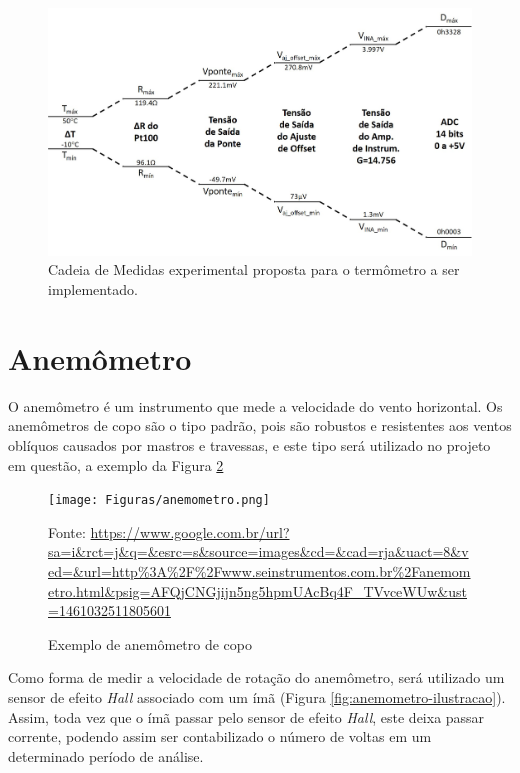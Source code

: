 \documentclass[a4paper]{instrumentacao}
\begin{document}
\begin{figure}[H]
	\centering \includegraphics[width=\textwidth]{termometro-cadeia-medidas-proposta.jpg}
	\caption{Cadeia de Medidas experimental proposta para o termômetro a ser implementado.}
	\label{fig:termometro-cadeia-medidas-proposta}
\end{figure}

\section{Anemômetro}
O anemômetro é um instrumento que mede a velocidade do vento horizontal. Os anemômetros de copo são o tipo padrão, pois são robustos e resistentes aos ventos oblíquos causados por mastros e travessas, e este tipo será utilizado no projeto em questão, a exemplo da Figura \ref{fig:anemometro}

\begin{figure}[h]
	\centering
		\texttt{[image: Figuras/anemometro.png]}
	\caption{Exemplo de anemômetro de copo}
	Fonte: \url{https://www.google.com.br/url?sa=i&rct=j&q=&esrc=s&source=images&cd=&cad=rja&uact=8&ved=&url=http\%3A\%2F\%2Fwww.seinstrumentos.com.br\%2Fanemometro.html&psig=AFQjCNGjijn5ng5hpmUAcBq4F_TVvceWUw&ust=1461032511805601}
	\label{fig:anemometro}
\end{figure}

Como forma de medir a velocidade de rotação do anemômetro, será utilizado um sensor de efeito \textit{Hall} associado com um ímã (Figura \ref{fig:anemometro-ilustracao}). Assim, toda vez que o ímã passar pelo sensor de efeito \textit{Hall}, este deixa passar corrente, podendo assim ser contabilizado o número de voltas em um determinado período de análise.
\end{document}
